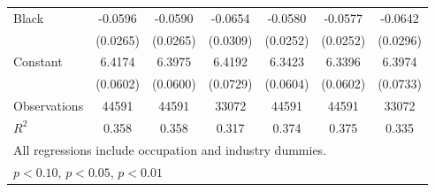 {\begin{longtable}{l*{6}{c}}
Black               &     -0.0596\sym{**} &     -0.0590\sym{**} &     -0.0654\sym{**} &     -0.0580\sym{**} &     -0.0577\sym{**} &     -0.0642\sym{**} \\
                    &    (0.0265)         &    (0.0265)         &    (0.0309)         &    (0.0252)         &    (0.0252)         &    (0.0296)         \\
Constant            &      6.4174\sym{***}&      6.3975\sym{***}&      6.4192\sym{***}&      6.3423\sym{***}&      6.3396\sym{***}&      6.3974\sym{***}\\
                    &    (0.0602)         &    (0.0600)         &    (0.0729)         &    (0.0604)         &    (0.0602)         &    (0.0733)         \\
\hline  
Observations        &       44591         &       44591         &       33072         &       44591         &       44591         &       33072         \\
\(R^{2}\)           &       0.358         &       0.358         &       0.317         &       0.374         &       0.375         &       0.335         \\
\hline  
\multicolumn{7}{l}{\footnotesize All regressions include occupation and industry dummies.}\\
\multicolumn{7}{l}{\footnotesize \sym{*} \(p<0.10\), \sym{**} \(p<0.05\), \sym{***} \(p<0.01\)}\\
\end{longtable}
}
